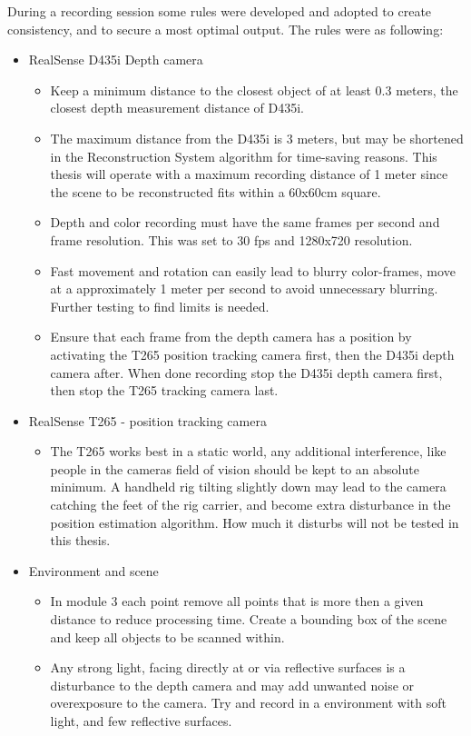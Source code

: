 During a recording session some rules were developed and adopted to create consistency, and to secure a most optimal output. The rules were as following: 
\begin{itemize}
    \item RealSense D435i Depth camera 
    \begin{itemize}
        \item Keep a minimum distance to the closest object of at least 0.3 meters, the closest depth measurement distance of D435i.
        \item The maximum distance from the D435i is 3 meters, but may be shortened in the Reconstruction System algorithm for time-saving reasons. This thesis will operate with a maximum recording distance of 1 meter since the scene to be reconstructed fits within a 60x60cm square. 
        \item Depth and color recording must have the same frames per second and frame resolution. This was set to 30 fps and 1280x720 resolution. 
        \item Fast movement and rotation can easily lead to blurry color-frames, move at a approximately 1 meter per second to avoid unnecessary blurring. Further testing to find limits is needed. 
        \item Ensure that each frame from the depth camera has a position by activating the T265 position tracking camera first, then the D435i depth camera after. When done recording stop the D435i depth camera first, then stop the T265 tracking camera last. 
    \end{itemize}
    \item RealSense T265 - position tracking camera
    \begin{itemize}
        \item The T265 works best in a static world, any additional interference, like people in the cameras field of vision should be kept to an absolute minimum. A handheld rig tilting slightly down may lead to the camera catching the feet of the rig carrier, and become extra disturbance in the position estimation algorithm. How much it disturbs will not be tested in this thesis.  
    \end{itemize}
    \item Environment and scene 
    \begin{itemize}
        \item In module 3 each point remove all points that is more then a given distance to reduce processing time. Create a bounding box of the scene and keep all objects to be scanned within. 
        \item Any strong light, facing directly at or via reflective surfaces is a disturbance to the depth camera and may add unwanted noise or overexposure to the camera. Try and record in a environment with soft light, and few reflective surfaces. 
    \end{itemize}
\end{itemize}


